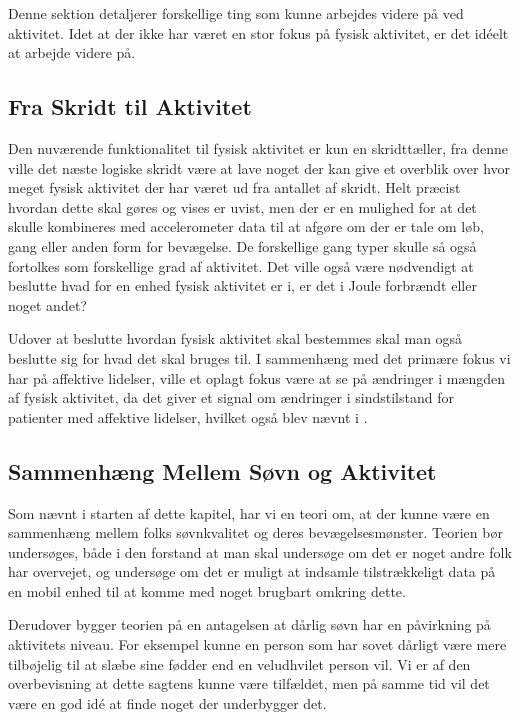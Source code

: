 Denne sektion detaljerer forskellige ting som kunne arbejdes videre på ved aktivitet.
Idet at der ikke har været en stor fokus på fysisk aktivitet, er det idéelt at arbejde videre på.

\subsection{Fra Skridt til Aktivitet}
Den nuværende funktionalitet til fysisk aktivitet er kun en skridttæller, fra denne ville det næste logiske skridt være at lave noget der kan give et overblik over hvor meget fysisk aktivitet der har været ud fra antallet af skridt.
Helt præcist hvordan dette skal gøres og vises er uvist, men der er en mulighed for at det skulle kombineres med accelerometer data til at afgøre om der er tale om løb, gang eller anden form for bevægelse.
De forskellige gang typer skulle så også fortolkes som forskellige grad af aktivitet. 
Det ville også være nødvendigt at beslutte hvad for en enhed fysisk aktivitet er i, er det i Joule forbrændt eller noget andet?

Udover at beslutte hvordan fysisk aktivitet skal bestemmes skal man også beslutte sig for hvad det skal bruges til.
I sammenhæng med det primære fokus vi har på affektive lidelser, ville et oplagt fokus være at se på ændringer i mængden af fysisk aktivitet, da det giver et signal om ændringer i sindstilstand for patienter med affektive lidelser, hvilket også blev nævnt i \citet[Kapitel 1, Sektion 4]{misc:faellesrapp}.

\subsection{Sammenhæng Mellem Søvn og Aktivitet}
Som nævnt i starten af dette kapitel, har vi en teori om, at der kunne være en sammenhæng mellem folks søvnkvalitet og deres bevægelsesmønster.
Teorien bør undersøges, både i den forstand at man skal undersøge om det er noget andre folk har overvejet, og undersøge om det er muligt at indsamle tilstrækkeligt data på en mobil enhed til at komme med noget brugbart omkring dette.

Derudover bygger teorien på en antagelsen at dårlig søvn har en påvirkning på aktivitets niveau.
For eksempel kunne en person som har sovet dårligt være mere tilbøjelig til at slæbe sine fødder end en veludhvilet person vil.
Vi er af den overbevisning at dette sagtens kunne være tilfældet, men på samme tid vil det være en god idé at finde noget der underbygger det.

